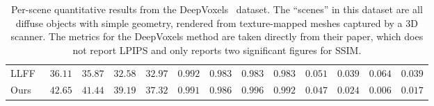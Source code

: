 \documentclass[runningheads]{llncs}
\begin{document}
\begin{table}[t]
{\begin{tabular}{l|cccc|cccc|cccc}
LLFF~\cite{mildenhall19} & $36.11$ & $35.87$ & $32.58$ & $32.97$ & $\mathbf{0.992}$ & $0.983$ & $0.983$ & $0.983$ & $0.051$ & $0.039$ & $0.064$ & $0.039$ \\
Ours       & $\mathbf{42.65}$ & $\mathbf{41.44}$ & $\mathbf{39.19}$ & $\mathbf{37.32}$ & ${0.991}$ & $\mathbf{0.986}$ & $\mathbf{0.996}$ & $\mathbf{0.992}$ & $\mathbf{0.047}$ & $\mathbf{0.024}$ & $\mathbf{0.006}$ & $\mathbf{0.017}$ \\
\end{tabular}
} \vspace{2mm}
\caption{Per-scene quantitative results from the DeepVoxels~\cite{deepvoxels} dataset. The ``scenes'' in this dataset are all diffuse objects with simple geometry, rendered from texture-mapped meshes captured by a 3D scanner. The metrics for the DeepVoxels method are taken directly from their paper, which does not report LPIPS and only reports two significant figures for SSIM.
}
\label{table:suppresults1}  
\end{table}
\setlength{\tabcolsep}{1.4pt}
\end{document}
